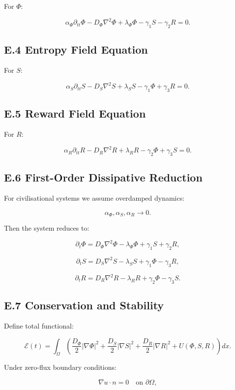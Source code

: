 \documentclass[12pt,a4paper]{article}
\theoremstyle{definition}
\begin{document}
For $\Phi$:

\[
\alpha_\Phi \partial_{tt} \Phi
-
D_\Phi \nabla^2 \Phi
+
\lambda_\Phi \Phi
-
\gamma_1 S
-
\gamma_2 R
=
0.
\]

\subsection*{E.4 Entropy Field Equation}

For $S$:

\[
\alpha_S \partial_{tt} S
-
D_S \nabla^2 S
+
\lambda_S S
-
\gamma_1 \Phi
+
\gamma_3 R
=
0.
\]

\subsection*{E.5 Reward Field Equation}

For $R$:

\[
\alpha_R \partial_{tt} R
-
D_R \nabla^2 R
+
\lambda_R R
-
\gamma_2 \Phi
+
\gamma_3 S
=
0.
\]

\subsection*{E.6 First-Order Dissipative Reduction}

For civilisational systems we assume overdamped dynamics:

\[
\alpha_\Phi, \alpha_S, \alpha_R \rightarrow 0.
\]

Then the system reduces to:

\[
\partial_t \Phi
=
D_\Phi \nabla^2 \Phi
-
\lambda_\Phi \Phi
+
\gamma_1 S
+
\gamma_2 R,
\]

\[
\partial_t S
=
D_S \nabla^2 S
-
\lambda_S S
+
\gamma_1 \Phi
-
\gamma_3 R,
\]

\[
\partial_t R
=
D_R \nabla^2 R
-
\lambda_R R
+
\gamma_2 \Phi
-
\gamma_3 S.
\]

\subsection*{E.7 Conservation and Stability}

Define total functional:

\[
\mathcal{E}(t)
=
\int_\Omega
\left(
\frac{D_\Phi}{2} |\nabla \Phi|^2
+
\frac{D_S}{2} |\nabla S|^2
+
\frac{D_R}{2} |\nabla R|^2
+
U(\Phi,S,R)
\right)
dx.
\]

Under zero-flux boundary conditions:

\[
\nabla u \cdot n = 0 \quad \text{on } \partial \Omega,
\]
\end{document}
